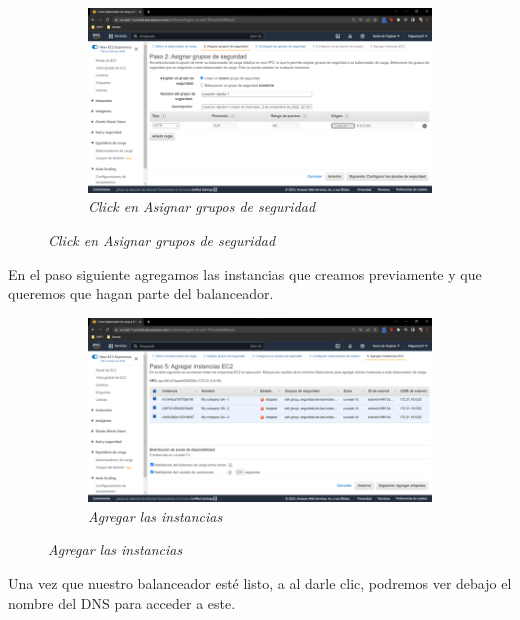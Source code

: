 \begin{figure}[H]
    \centering
    \begin{subfigure}[b]{0.8\textwidth}
        \centering
        \includegraphics[width=\textwidth]{Figures/0. General/load_balancer_8.png}
        \caption{\textit{Click en Asignar grupos de seguridad}}
        \label{fig: load balancer 8}
    \end{subfigure}
\end{figure}

En el paso siguiente agregamos las instancias que creamos previamente y que queremos que
hagan parte del balanceador.

\begin{figure}[H]
    \centering
    \begin{subfigure}[b]{0.8\textwidth}
        \centering
        \includegraphics[width=\textwidth]{Figures/0. General/load_balancer_9.png}
        \caption{\textit{Agregar las instancias}}
        \label{fig: load balancer 9}
    \end{subfigure}
\end{figure}

Una vez que nuestro balanceador esté listo, a al darle clic, podremos ver debajo
el nombre del DNS para acceder a este.

